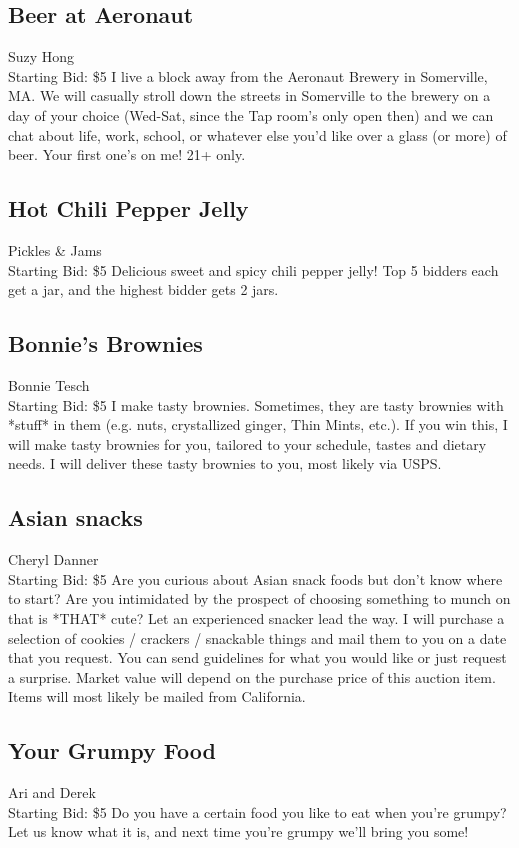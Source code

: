 \documentclass[11pt]{article}
\begin{document}
\subsection{Beer at Aeronaut}
Suzy Hong
\\
Starting Bid: \$5
\newline
I live a block away from the Aeronaut Brewery in Somerville, MA. We will casually stroll down the streets in Somerville to the brewery on a day of your choice (Wed-Sat, since the Tap room's only open then) and we can chat about life, work, school, or whatever else you'd like over a glass (or more) of beer. Your first one's on me! 21+ only.
\subsection{Hot Chili Pepper Jelly}
Pickles \& Jams
\\
Starting Bid: \$5
\newline
Delicious sweet and spicy chili pepper jelly! Top 5 bidders each get a jar, and the highest bidder gets 2 jars.
\subsection{Bonnie's Brownies}
Bonnie Tesch
\\
Starting Bid: \$5
\newline
I make tasty brownies. Sometimes, they are tasty brownies with *stuff* in them (e.g. nuts, crystallized ginger, Thin Mints, etc.). If you win this, I will make tasty brownies for you, tailored to your schedule, tastes and dietary needs. I will deliver these tasty brownies to you, most likely via USPS.
\subsection{Asian snacks}
Cheryl Danner
\\
Starting Bid: \$5
\newline
Are you curious about Asian snack foods but don't know where to start? Are you intimidated by the prospect of choosing something to munch on that is *THAT* cute? Let an experienced snacker lead the way. I will purchase a selection of cookies / crackers / snackable things and mail them to you on a date that you request. You can send guidelines for what you would like or just request a surprise. Market value will depend on the purchase price of this auction item. Items will most likely be mailed from California.
\subsection{Your Grumpy Food}
Ari and Derek
\\
Starting Bid: \$5
\newline
Do you have a certain food you like to eat when you're grumpy? Let us know what it is, and next time you're grumpy we'll bring you some!
\end{document}
